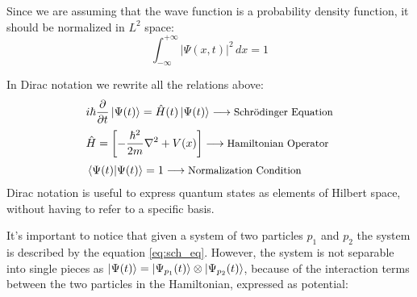 \documentclass[12pt,a4paper]{article}
\begin{document}
Since we are assuming that the wave function is a probability density function, it should be normalized in $L^2$ space:
\begin{equation*}
    \int_{-\infty}^{+\infty} |\Psi(x,t)|^2 \, dx = 1
\end{equation*}

In Dirac notation we rewrite all the relations above:
\begin{align}
&i \hbar \dfrac{\partial}{\partial t} \ket{\Psi(t)} = \hat{H}(t) \ket{\Psi(t)} \longrightarrow \text{\small Schrödinger Equation} \label{eq:sch_eq} \\[2pt]
&\hat{H} = \left[-\dfrac{\hbar^2}{2m} \nabla^2 + V(x)\right] \longrightarrow \text{\small Hamiltonian Operator} \\[2pt]
&\braket{\Psi(t)}{\Psi(t)} = 1 \longrightarrow \text{\small Normalization Condition}
\end{align}
Dirac notation is useful to express quantum states as elements of Hilbert space, without having to refer to a specific basis.

It's important to notice that given a system of two particles $p_1$ and $p_2$ the system is described by the equation \eqref{eq:sch_eq}. However, the system is not separable into single pieces as $\ket{\Psi(t)} = \ket{\Psi_{p_1}(t)} \otimes \ket{\Psi_{p_2}(t)}$, because of the interaction terms between the two particles in the Hamiltonian, expressed as potential:
\end{document}
